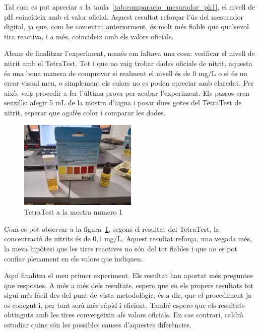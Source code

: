 Tal com es pot apreciar a la taula~\ref{tab:comparacio_mesurador_ph1}, el nivell de pH coincideix amb el valor oficial. Aquest resultat reforçar l'ús del mesurador digital, ja que, com he comentat anteriorment, és molt més fiable que qualsevol tira reactiva, i a més, coincideix amb els valors oficials.

Abans de finalitzar l’experiment, només em faltava una cosa: verificar el nivell de nitrit amb el TetraTest. Tot i que no vaig trobar dades oficials de nitrit, aquesta és una bona manera de comprovar si realment el nivell és de 0 mg/L o si és un error visual meu, o simplement els colors no es poden apreciar amb claredat. Per això, vaig procedir a fer l’última prova per acabar l’experiment. Els passos eren senzills: afegir 5 mL de la mostra d’aigua i posar dues gotes del TetraTest de nitrit, esperar que agafés color i comparar les dades.

\begin{figure}[H]
\centering
\includegraphics[width=0.5\textwidth]{./Figures/Tetra1.png}
\caption{TetraTest a la mostra numero 1}
\label{fig:TetraTestdeNitrit1}
\end{figure}

Com es pot observar a la figura~\ref{fig:TetraTestdeNitrit1}, segons el resultat del TetraTest, la concentració de nitrits és de 0,1 mg/L. Aquest resultat reforça, una vegada més, la meva hipòtesi que les tires reactives no són del tot fiables i que no es pot confiar plenament en els valors que indiquen.

Aquí finalitza el meu primer experiment. Els resultat han aportat més preguntes que respostes. A més a més dels resultats, espero que en els propers resultats tot sigui més fàcil des del punt de vista metodològic, és a dir, que el procediment ja es conegut i, per tant serà més rápid i eficient. També espero que els resultats obtinguts amb les tires convergeixin als valors oficials. En cas contrari, caldrà estudiar quins són les possibles causes d'aquestes diferències.


